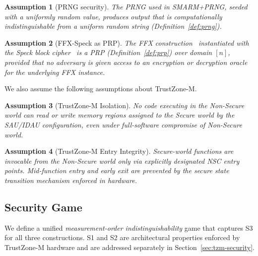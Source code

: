 \documentclass{ieeeaccess}
\newcommand{\rtsmarmone}{SMARM+PRNG\xspace}
\newtheorem{assumption}{Assumption}[section]
\begin{document}
\begin{assumption}[PRNG security]
\label{asm:prng}
The PRNG used in \rtsmarmone, seeded with a uniformly random value, produces
output that is computationally indistinguishable from a uniform random string
(Definition~\ref{def:prng}).
\end{assumption}
 
\begin{assumption}[FFX-Speck as PRP]
\label{asm:ffx-prp}
The FFX construction~\cite{bellare2010ffx} instantiated with the Speck block
cipher~\cite{speck} is a PRP (Definition~\ref{def:prp}) over
domain $[n]$, provided that no adversary is given access to an
encryption or decryption oracle for the underlying FFX instance.
\end{assumption}

We also assume the following assumptions about TrustZone-M.
 
\begin{assumption}[TrustZone-M Isolation]
\label{asm:tz-isolation}
No code executing in the Non-Secure world can read or write memory
regions assigned to the Secure world by the SAU/IDAU configuration,
even under full-software compromise of Non-Secure world.
\end{assumption}
 
\begin{assumption}[TrustZone-M Entry Integrity]
\label{asm:tz-entry}
Secure-world functions are invocable from the Non-Secure world only via
explicitly designated NSC entry points.
Mid-function entry and early exit are prevented by the secure state transition mechanism enforced in hardware.
\end{assumption}
 
 
\subsection{Security Game}
\label{sec:game}
 
We define a unified \emph{measurement-order indistinguishability} game that
captures S3 for all three constructions.
S1 and S2 are architectural properties enforced by TrustZone-M hardware
and are addressed separately in Section~\ref{sec:tzm-security}.
 
\end{document}
